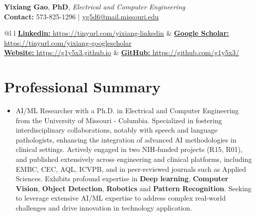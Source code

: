 \documentclass[letterpaper,10pt]{article}
\begin{document}
\begin{flushleft}
  \textbf{\large Yixiang Gao},
  \textbf{\large PhD}, 
  \textit{\large Electrical and Computer Engineering}\\
  \vspace{2.5pt}
  \textbf{Contact:} 573-825-1296 $|$
  \href{mailto:yg5d6@mail.missouri.edu}{yg5d6@mail.missouri.edu}\\
\end{flushleft}

\begin{tabular*}{\textwidth}{@{\extracolsep{\fill}}l l}
  \href{https://www.linkedin.com/in/yixiang-gao-13a1408b/}
  {{\textbf{Linkedin:} https://tinyurl.com/yixiang-linkedin}} & 
  \href{https://scholar.google.com/citations?user=7104qXwAAAAJ&hl=en}
  {{\textbf{Google Scholar:} https://tinyurl.com/yixiang-googlescholar}}\\
  
  \href{https://g1y5x3.github.io}{{\textbf{Website:} https://g1y5x3.github.io}} &
  \href{https://github.com/g1y5x3/}{{\textbf{GitHub:} https://github.com/g1y5x3/}}
\end{tabular*} 

\section{Professional Summary}
\begin{itemize}[leftmargin=0.15in, label={}]
  \item{AI/ML Researcher with a Ph.D. in Electrical and Computer Engineering
  from the University of Missouri - Columbia. Specialized in fostering
  interdisciplinary collaborations, notably with speech and language
  pathologists, enhancing the integration of advanced AI methodologies in
  clinical settings. Actively engaged in two NIH-funded projects (R15, R01), and
  published extensively across engineering and clinical platforms, including 
  EMBC, CEC, AQL, ICVPB, and in peer-reviewed journals such as Applied Sciences.
  Exhibits profound expertise in \textbf{Deep learning}, 
  \textbf{Computer Vision}, \textbf{Object Detection}, \textbf{Robotics} and 
  \textbf{Pattern Recognition}. Seeking to leverage extensive AI/ML expertise 
  to address complex real-world challenges and drive innovation in technology 
  application.}
\end{itemize}

\end{document}
